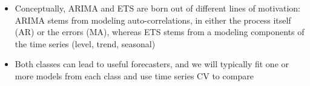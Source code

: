 \documentclass{article}
\begin{document}
\begin{itemize}
\item Conceptually, ARIMA and ETS are born out of different lines of motivation:
  ARIMA stems from modeling auto-correlations, in either the process itself (AR) 
  or the errors (MA), whereas ETS stems from a modeling components of the time
  series (level, trend, seasonal)

\item Both classes can lead to useful forecasters, and we will typically fit one
  or more models from each class and use time series CV to compare    
\end{itemize}
\end{document}
